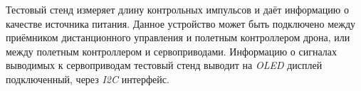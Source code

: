 Тестовый стенд измеряет длину контрольных импульсов и даёт информацию о качестве источника питания.
Данное устройство может быть подключено между приёмником дистанционного управления и полетным контроллером дрона,
или между полетным контроллером и сервоприводами.
Информацию о сигналах выводимых к сервоприводам тестовый стенд выводит на \textit{OLED} дисплей подключенный, через \textit{I2C} интерфейс.